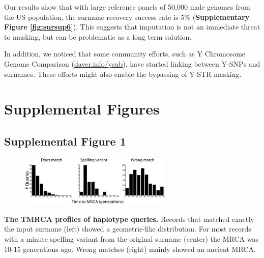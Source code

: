 Our results show that with large reference panels of 50,000 male genomes from the US population, the surname recovery success rate is 5\% (\textbf{Supplementary Figure \ref{fig:sursup6}}). This suggests that imputation is not an immediate threat to masking, but can be problematic as a long term solution.

In addition, we noticed that some community efforts, such as Y Chromosome Genome Comparison (\url{daver.info/ysub}), have started linking between Y-SNPs and surnames. These efforts might also enable the bypassing of Y-STR masking.

\pagebreak
\section{Supplemental Figures}
\subsection{Supplemental Figure 1}
\begin{figure}[h!]
\centering
\label{fig:sursup1}
\includegraphics[width=0.65\textwidth]{Figures/App1/SuppFig1.jpg}
\end{figure}
\textbf{The TMRCA profiles of haplotype queries.} Records that matched exactly the input surname (left) showed a geometric-like distribution. For most records with a minute spelling variant from the original surname (center) the  MRCA was 10-15 generations ago. Wrong matches (right) mainly showed an ancient MRCA.

\pagebreak
